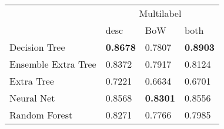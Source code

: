 \begin{tabular}{|l|l|l|l| }
\hline
 &  \multicolumn{3}{c|}{Multilabel} \\
\cline{2-4} & desc & BoW & both \\ \hline
Decision Tree       & {\bf 0.8678} & 0.7807 & {\bf 0.8903}\\
Ensemble Extra Tree & 0.8372 & 0.7917 & 0.8124\\
Extra Tree          & 0.7221 & 0.6634 & 0.6701\\
Neural Net          & 0.8568 & {\bf 0.8301} & 0.8556\\
Random Forest       & 0.8271 & 0.7766 & 0.7985\\
\hline
\end{tabular}